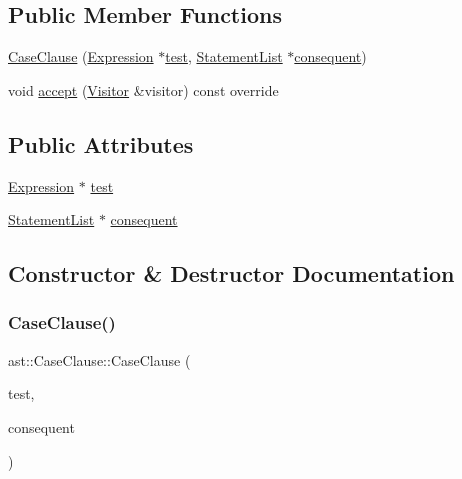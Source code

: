 \subsection*{Public Member Functions}
\begin{DoxyCompactItemize}
\item 
\hyperlink{structast_1_1_case_clause_a9f9501a1d6e46037478537f54e1a1cfa}{Case\+Clause} (\hyperlink{structast_1_1_expression}{Expression} $\ast$\hyperlink{structast_1_1_case_clause_aee3633f283d925ec229674d09970b4b9}{test}, \hyperlink{structast_1_1_statement_list}{Statement\+List} $\ast$\hyperlink{structast_1_1_case_clause_ad858f522c59ec1fe025067c1799df288}{consequent})
\item 
void \hyperlink{structast_1_1_case_clause_a070bb52dc711dc7272ab8d2496631723}{accept} (\hyperlink{structast_1_1_visitor}{Visitor} \&visitor) const override
\end{DoxyCompactItemize}
\subsection*{Public Attributes}
\begin{DoxyCompactItemize}
\item 
\hyperlink{structast_1_1_expression}{Expression} $\ast$ \hyperlink{structast_1_1_case_clause_aee3633f283d925ec229674d09970b4b9}{test}
\item 
\hyperlink{structast_1_1_statement_list}{Statement\+List} $\ast$ \hyperlink{structast_1_1_case_clause_ad858f522c59ec1fe025067c1799df288}{consequent}
\end{DoxyCompactItemize}


\subsection{Constructor \& Destructor Documentation}
\mbox{\label{structast_1_1_case_clause_a9f9501a1d6e46037478537f54e1a1cfa}} 
\subsubsection{\texorpdfstring{Case\+Clause()}{CaseClause()}}
{\footnotesize\ttfamily ast\+::\+Case\+Clause\+::\+Case\+Clause (\begin{DoxyParamCaption}\item[{\hyperlink{structast_1_1_expression}{Expression} $\ast$}]{test,  }\item[{\hyperlink{structast_1_1_statement_list}{Statement\+List} $\ast$}]{consequent }\end{DoxyParamCaption})\hspace{0.3cm}{\ttfamily [inline]}}



